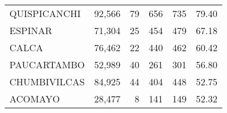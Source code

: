 \begin{tabular}{@{}lrrrrr@{}}
	\cellcolor[HTML]{9AFF99}QUISPICANCHI                                               & 92,566                                                         & 79                                                       & 656                                                      & 735                                                                 & 79.40                                                                        \\
	\cellcolor[HTML]{9AFF99}ESPINAR                                                    & 71,304                                                         & 25                                                       & 454                                                      & 479                                                                 & 67.18                                                                        \\
	\cellcolor[HTML]{9AFF99}CALCA                                                      & 76,462                                                         & 22                                                       & 440                                                      & 462                                                                 & 60.42                                                                        \\
	\cellcolor[HTML]{9AFF99}PAUCARTAMBO                                                & 52,989                                                         & 40                                                       & 261                                                      & 301                                                                 & 56.80                                                                        \\
	\cellcolor[HTML]{9AFF99}CHUMBIVILCAS                                               & 84,925                                                         & 44                                                       & 404                                                      & 448                                                                 & 52.75                                                                        \\
	\cellcolor[HTML]{9AFF99}ACOMAYO                                                    & 28,477                                                         & 8                                                        & 141                                                      & 149                                                                 & 52.32                                                                        \\

\end{tabular}

